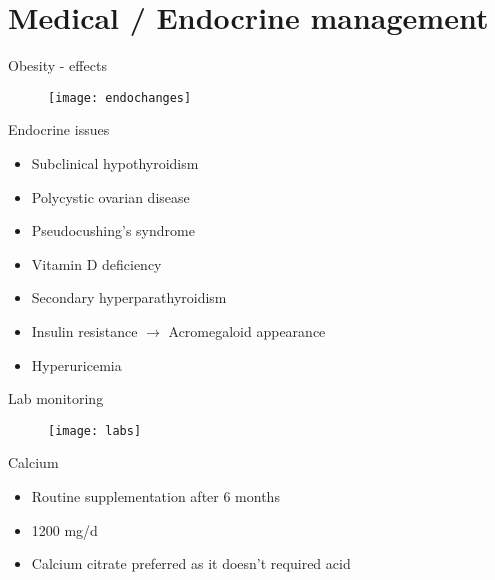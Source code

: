 \documentclass[11pt]{beamer}
\begin{document}
{
\begin{frame}[plain]
\end{frame}
} 
\section{Medical / Endocrine management}
\begin{frame}{Obesity - effects }
  \begin{figure}
  \texttt{[image: endochanges]}
  \end{figure}
\end{frame} 
\begin{frame}{ Endocrine issues }
\begin{itemize}

\item Subclinical hypothyroidism
\item Polycystic ovarian disease
\item Pseudocushing's syndrome
\item Vitamin D deficiency
\item Secondary hyperparathyroidism
\item Insulin resistance $\rightarrow  $ Acromegaloid appearance
\item Hyperuricemia
\end{itemize}
\end{frame}  
\begin{frame}[shrink]{Lab monitoring }
   \begin{flushleft}
   \begin{figure}
   \texttt{[image: labs]}
   \end{figure}
   \end{flushleft}
\end{frame}
 \begin{frame}{Calcium  }
 \begin{itemize}
 
 \item Routine supplementation after 6 months
 \item 1200 mg/d
 \item Calcium citrate preferred as it doesn't required acid
 	
 \end{itemize}
 \end{frame} 
\end{document}
